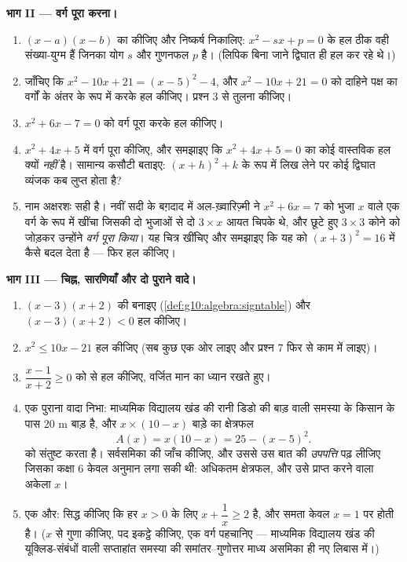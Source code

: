 \begin{problem}[{सप्ताहांत समस्या --- योग-और-गुणनफल की समस्याएँ, अल-ख़्वारिज़्मी
के खींचे चित्र के अनुसार वर्ग पूरा करना, और समीकरण $x^2 = x + 1$}]
\medskip
\noindent\textbf{भाग II --- वर्ग पूरा करना।}
\begin{enumerate}[resume]
  \item $(x - a)(x - b)$ का  कीजिए और निष्कर्ष निकालिए: $x^2 - sx + p = 0$ के हल ठीक वही
        संख्या-युग्म हैं जिनका योग $s$ और गुणनफल $p$ है। (लिपिक बिना
        जाने द्विघात  ही हल कर रहे थे।)
  \item जाँचिए कि $x^2 - 10x + 21 = (x - 5)^2 - 4$, और $x^2 - 10x + 21 = 0$ को दाहिने पक्ष का वर्गों के अंतर के रूप
        में  करके हल कीजिए। प्रश्न 3 से तुलना कीजिए।
  \item $x^2 + 6x - 7 = 0$ को वर्ग पूरा करके हल कीजिए।
  \item $x^2 + 4x + 5$ में वर्ग पूरा कीजिए, और समझाइए कि  $x^2 + 4x + 5 = 0$ का कोई
        वास्तविक हल क्यों \emph{नहीं} है। सामान्य कसौटी बताइए: $(x + h)^2 + k$ के
        रूप में लिख लेने पर कोई द्विघात व्यंजक कब लुप्त होता है?
  \item नाम अक्षरशः सही है। नवीं सदी के बग़दाद में अल-ख़्वारिज़्मी ने $x^2 + 6x = 7$
        को भुजा $x$ वाले एक वर्ग के रूप में खींचा जिसकी दो भुजाओं से दो
        $3 \times x$ आयत चिपके थे, और छूटे हुए $3 \times 3$ कोने को जोड़कर उन्होंने
        \emph{वर्ग पूरा किया}। यह चित्र खींचिए और समझाइए कि यह  को
        $(x + 3)^2 = 16$ में कैसे बदल देता है --- फिर हल कीजिए।
\end{enumerate}

\medskip
\noindent\textbf{भाग III --- चिह्न, सारणियाँ और दो पुराने वादे।}
\begin{enumerate}[resume]
  \item $(x - 3)(x + 2)$ की  बनाइए (\cref{def:g10:algebra:signtable}) और $(x - 3)(x + 2) < 0$ हल कीजिए।
  \item $x^2 \leq 10x - 21$ हल कीजिए (सब कुछ एक ओर लाइए और प्रश्न 7 फिर से काम में लाइए)।
  \item $\dfrac{x - 1}{x + 2} \geq 0$ को  से हल कीजिए, वर्जित मान का ध्यान रखते हुए।
  \item एक पुराना वादा निभा: माध्यमिक विद्यालय खंड की रानी डिडो की बाड़
        वाली समस्या के किसान के पास $20$ m बाड़ है, और $x \times (10 - x)$ बाड़े का
        क्षेत्रफल
        \[
        A(x) = x(10 - x) = 25 - (x - 5)^2 .
        \]
        को संतुष्ट करता है। सर्वसमिका की जाँच कीजिए, और उससे उस बात की
        \emph{उपपत्ति} पढ़ लीजिए जिसका कक्षा 6 केवल अनुमान लगा सकी थी:
        अधिकतम क्षेत्रफल, और उसे प्राप्त करने वाला अकेला $x$।
  \item एक और: सिद्ध कीजिए कि हर $x > 0$ के लिए $x + \dfrac1x \geq 2$ है, और समता केवल $x = 1$
        पर होती है। ($x$ से गुणा कीजिए, पद इकट्ठे कीजिए, एक वर्ग पहचानिए
        --- माध्यमिक विद्यालय खंड की यूक्लिड-संबंधों वाली सप्ताहांत समस्या
        की समांतर--गुणोत्तर माध्य असमिका ही नए लिबास में।)
\end{enumerate}


\end{problem}
